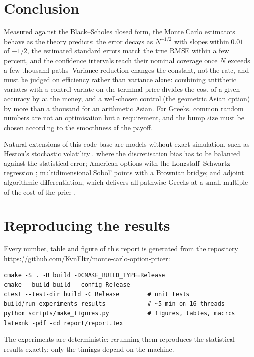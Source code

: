 \documentclass[11pt,a4paper]{article}
\newcommand{\1}{\mathbf{1}}
\newcommand{\repo}{\url{https://github.com/KvnFltr/monte-carlo-option-pricer}}
\theoremstyle{plain}
\theoremstyle{remark}
\begin{document}
\begin{table}[ht]
\centering
\caption{Crude Monte Carlo price of the at-the-money call with $\PerfPaths$ paths against the number of threads.}
\label{tab:perf}

\end{table}

\section{Conclusion}

Measured against the Black--Scholes closed form, the Monte Carlo estimators behave as the theory predicts: the
error decays as $N^{-1/2}$ with slopes within $0.01$ of $-1/2$, the estimated standard errors match the true
RMSE within a few percent, and the confidence intervals reach their nominal coverage once $N$ exceeds a few
thousand paths. Variance reduction changes the constant, not the rate, and must be judged on efficiency rather
than variance alone: combining antithetic variates with a control variate on the terminal price divides the
cost of a given accuracy by \EffBoth{} at the money, and a well-chosen control (the geometric Asian option) by
more than a thousand for an arithmetic Asian. For Greeks, common random numbers are not an optimisation but a
requirement, and the bump size must be chosen according to the smoothness of the payoff.

Natural extensions of this code base are models without exact simulation, such as Heston's stochastic
volatility \citep{heston1993}, where the discretisation bias has to be balanced against the statistical error;
American options with the Longstaff--Schwartz regression \citep{longstaff2001}; multidimensional Sobol' points
with a Brownian bridge; and adjoint algorithmic differentiation, which delivers all pathwise Greeks at a small
multiple of the cost of the price \citep{giles2006}.

\appendix
\section{Reproducing the results}\label{app:reproduce}

Every number, table and figure of this report is generated from the repository \repo:
\begin{verbatim}
cmake -S . -B build -DCMAKE_BUILD_TYPE=Release
cmake --build build --config Release
ctest --test-dir build -C Release        # unit tests
build/run_experiments results            # ~5 min on 16 threads
python scripts/make_figures.py           # figures, tables, macros
latexmk -pdf -cd report/report.tex
\end{verbatim}
The experiments are deterministic: rerunning them reproduces the statistical results exactly; only the
timings depend on the machine.



\end{document}
